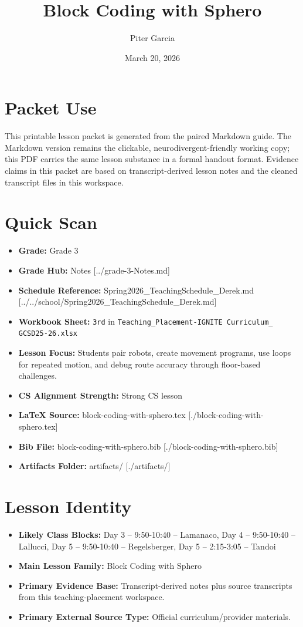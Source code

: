 \documentclass[11pt]{article}
\title{Block Coding with Sphero}
\author{Piter Garcia}
\date{March 20, 2026}
\begin{document}
\maketitle
\section*{Packet Use}
This printable lesson packet is generated from the paired Markdown guide. The Markdown version remains the clickable, neurodivergent-friendly working copy; this PDF carries the same lesson substance in a formal handout format. Evidence claims in this packet are based on transcript-derived lesson notes and the cleaned transcript files in this workspace.

\section*{Quick Scan}
\begin{itemize}[leftmargin=*]
\item \textbf{Grade:} Grade 3
\item \textbf{Grade Hub:} Notes [../grade-3-Notes.md]
\item \textbf{Schedule Reference:} Spring2026\_TeachingSchedule\_Derek.md [../../school/Spring2026\_TeachingSchedule\_Derek.md]
\item \textbf{Workbook Sheet:} \texttt{3rd} in \texttt{Teaching\_Placement-IGNITE Curriculum\_ GCSD25-26.xlsx}
\item \textbf{Lesson Focus:} Students pair robots, create movement programs, use loops for repeated motion, and debug route accuracy through floor-based challenges.
\item \textbf{CS Alignment Strength:} Strong CS lesson
\item \textbf{LaTeX Source:} block-coding-with-sphero.tex [./block-coding-with-sphero.tex]
\item \textbf{Bib File:} block-coding-with-sphero.bib [./block-coding-with-sphero.bib]
\item \textbf{Artifacts Folder:} artifacts/ [./artifacts/]
\end{itemize}

\section*{Lesson Identity}
\begin{itemize}[leftmargin=*]
\item \textbf{Likely Class Blocks:} Day 3 -- 9:50-10:40 -- Lamanaco, Day 4 -- 9:50-10:40 -- Lallucci, Day 5 -- 9:50-10:40 -- Regelsberger, Day 5 -- 2:15-3:05 -- Tandoi
\item \textbf{Main Lesson Family:} Block Coding with Sphero
\item \textbf{Primary Evidence Base:} Transcript-derived notes plus source transcripts from this teaching-placement workspace.
\item \textbf{Primary External Source Type:} Official curriculum/provider materials.
\end{itemize}
\end{document}
